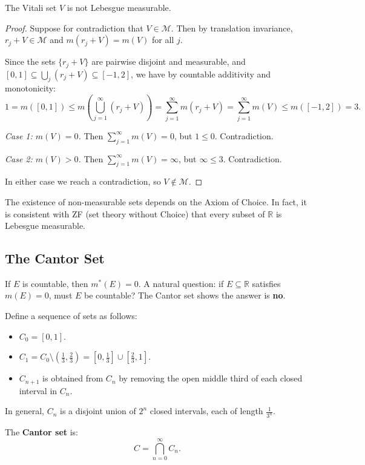 \documentclass[11pt]{report}
\begin{document}
\begin{thmbox}
The Vitali set $V$ is not Lebesgue measurable.
\end{thmbox}

\begin{proof}
Suppose for contradiction that $V \in \mathcal{M}$. Then by translation invariance, $r_j + V \in \mathcal{M}$ and $m(r_j + V) = m(V)$ for all $j$.

Since the sets $\{r_j + V\}$ are pairwise disjoint and measurable, and $[0, 1] \subseteq \bigcup_j (r_j + V) \subseteq [-1, 2]$, we have by countable additivity and monotonicity:
\[
1 = m([0, 1]) \leq m\left(\bigcup_{j=1}^{\infty} (r_j + V)\right) = \sum_{j=1}^{\infty} m(r_j + V) = \sum_{j=1}^{\infty} m(V) \leq m([-1, 2]) = 3.
\]

\textit{Case 1: $m(V) = 0$.} Then $\sum_{j=1}^{\infty} m(V) = 0$, but $1 \leq 0$. Contradiction.

\textit{Case 2: $m(V) > 0$.} Then $\sum_{j=1}^{\infty} m(V) = \infty$, but $\infty \leq 3$. Contradiction.

In either case we reach a contradiction, so $V \notin \mathcal{M}$.
\end{proof}

\begin{rembox}
The existence of non-measurable sets depends on the Axiom of Choice. In fact, it is consistent with ZF (set theory without Choice) that every subset of $\mathbb{R}$ is Lebesgue measurable.
\end{rembox}

\subsection{The Cantor Set}

If $E$ is countable, then $m^*(E) = 0$. A natural question: if $E \subseteq \mathbb{R}$ satisfies $m(E) = 0$, must $E$ be countable? The Cantor set shows the answer is \textbf{no}.

\begin{defbox}
Define a sequence of sets as follows:
\begin{itemize}
    \item $C_0 = [0, 1]$.
    \item $C_1 = C_0 \setminus \left(\frac{1}{3}, \frac{2}{3}\right) = \left[0, \frac{1}{3}\right] \cup \left[\frac{2}{3}, 1\right]$.
    \item $C_{n+1}$ is obtained from $C_n$ by removing the open middle third of each closed interval in $C_n$.
\end{itemize}

In general, $C_n$ is a disjoint union of $2^n$ closed intervals, each of length $\frac{1}{3^n}$.

The \textbf{Cantor set} is:
\[
C = \bigcap_{n=0}^{\infty} C_n.
\]
\end{defbox}
\end{document}
